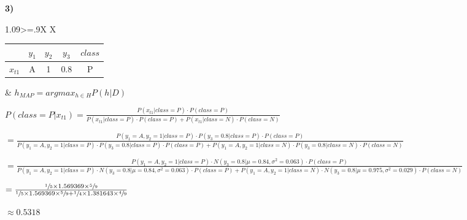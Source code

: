 \documentclass[11pt,a4paper]{article}
\begin{document}
\begin{center}
  \textbf{ }
\end{center}

\begin{flushleft}
\textbf{3)} \par
\small

\begin{tabularx}{1.09\textwidth}{>{\hsize=.9\hsize}X X}
  \vspace{1mm}\begin{tabular}{c|c|c|c|c|}
    \cline{2-5}
                                  & $y_1$ & $y_2$ & $y_3$ & $class$ \\ \hline
    \multicolumn{1}{|c|}{$x_{t1}$} & A     & 1     & 0.8   & P       \\ \hline
  \end{tabular}
  &
  $ h_{MAP} = argmax_{h \in H}P(h|D) $
\end{tabularx} \par
  \vspace{3.5mm}\small $ P(class = P | x_{t1}) = \frac{P(x_{t1} | class = P) \cdot P(class = P)}{P(x_{t1} | class = P) \cdot P(class = P) + P(x_{t1} | class = N) \cdot P(class = N)} $ \par
  \vspace{2mm}\footnotesize $ = \frac{P(y_1 = A, y_2 = 1 | class = P) \cdot P(y_3 = 0.8 | class = P) \cdot P(class = P)}{P(y_1 = A, y_2 = 1 | class = P) \cdot P(y_3 = 0.8 | class = P) \cdot P(class = P) + P(y_1 = A, y_2 = 1 | class = N) \cdot P(y_3 = 0.8 | class = N) \cdot P(class = N)} $ \par
  \vspace{2mm}\footnotesize $ = \frac{P(y_1 = A, y_2 = 1 | class = P) \cdot N(y_3 = 0.8 | \mu = 0.84, \sigma^2 = 0.063) \cdot P(class = P)}{P(y_1 = A, y_2 = 1 | class = P) \cdot N(y_3 = 0.8 | \mu = 0.84, \sigma^2 = 0.063) \cdot P(class = P) + P(y_1 = A, y_2 = 1 | class = N) \cdot N(y_3 = 0.8 | \mu = 0.975, \sigma^2 = 0.029) \cdot P(class = N)} $ \par
  \vspace{2mm}\small $ = \frac{\sfrac{1}{5} \times 1.569369 \times \sfrac{5}{9}}{\sfrac{1}{5} \times 1.569369 \times \sfrac{5}{9} + \sfrac{1}{4} \times 1.381643 \times \sfrac{4}{9}} $ \par
  \vspace{2.5mm}\small $ \approx 0.5318 $ \par


\end{flushleft}
\end{document}
